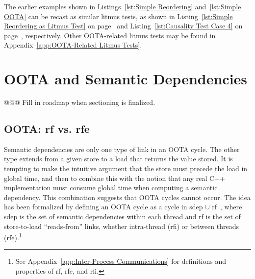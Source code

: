 \documentclass[10]{article}
\begin{document}
The earlier examples shown in
Listings~\ref{lst:Simple Reordering}
and~\ref{lst:Simple OOTA}
can be recast as similar  litmus tests, as shown in
Listing~\ref{lst:Simple Reordering as Litmus Test}
on page~\pageref{lst:Simple Reordering as Litmus Test}
and Listing~\ref{lst:Causality Test Case 4}
on page~\pageref{lst:Causality Test Case 4}, respectively.
Other OOTA-related litmus tests may be found in
Appendix~\ref{app:OOTA-Related Litmus Tests}.

\section{OOTA and Semantic Dependencies}
\label{sec:OOTA and Semantic Dependencies}

@@@ Fill in roadmap when sectioning is finalized.

\subsection{OOTA: rf vs. rfe}
\label{sec:OOTA: rf vs. rfe}

Semantic dependencies are only one type of link in an OOTA cycle.
The other type extends from a given store to a load that returns the
value stored.
It is tempting to make the intuitive argument that the store must precede
the load in global time, and then to combine this with the notion that
any real C++ implementation must consume global time when computing a
semantic dependency.
This combination suggests that OOTA cycles cannot occur.
The idea has been formalized by defining an OOTA cycle as a cycle
in sdep $\cup$ rf~\cite{PaulEMcKenney2014OOTA},
where sdep is the set of semantic dependencies within
each thread and rf is the set of store-to-load ``reads-from'' links,
whether intra-thread
(rfi) or between threads (rfe).\footnote{
	See Appendix~\ref{app:Inter-Process Communications} for definitions
	and properties of rf, rfe, and rfi.}
\end{document}
